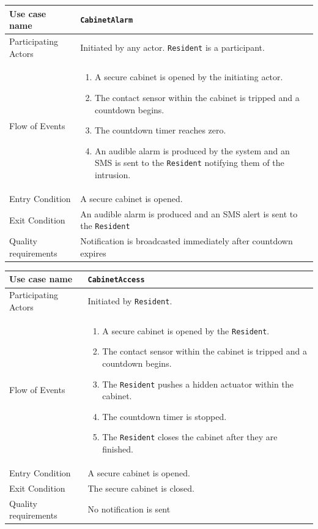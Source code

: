\documentclass{report}
\begin{document}
\begin{tabular}{| l | p{12cm} |}
\hline
Use case name & \texttt{CabinetAlarm} \\ \hline
Participating Actors & Initiated by any actor. \texttt{Resident} is a participant. \\ \hline
Flow of Events & 

\begin{enumerate}
 \item A secure cabinet is opened by the initiating actor.
 \item The contact sensor within the cabinet is tripped and a countdown begins.
 \item The countdown timer reaches zero.
 \item An audible alarm is produced by the system and an SMS is sent to the
       \texttt{Resident} notifying them of the intrusion.
\end{enumerate}

\\ \hline

Entry Condition & A secure cabinet is opened. \\ \hline
Exit Condition & An audible alarm is produced and an SMS alert is sent to
                 the \texttt{Resident} \\ \hline
Quality requirements & Notification is broadcasted immediately after countdown
expires\\ \hline

\hline
\end{tabular}

\begin{tabular}{| l | p{12cm} |}
\hline
Use case name & \texttt{CabinetAccess} \\ \hline
Participating Actors & Initiated by \texttt{Resident}. \\ \hline
Flow of Events & 

\begin{enumerate}
 \item A secure cabinet is opened by the \texttt{Resident}.
 \item The contact sensor within the cabinet is tripped and a countdown begins.
 \item The \texttt{Resident} pushes a hidden actuator within the cabinet.
 \item The countdown timer is stopped.
 \item The \texttt{Resident} closes the cabinet after they are finished.
\end{enumerate}

\\ \hline

Entry Condition & A secure cabinet is opened. \\ \hline
Exit Condition & The secure cabinet is closed. \\ \hline
Quality requirements & No notification is sent \\ \hline

\hline
\end{tabular}
\end{document}
